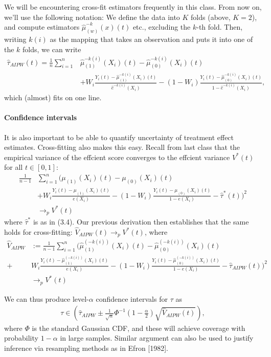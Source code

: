 We will be encountering cross-fit estimators frequently in this class. From now on,
we'll use the following notation: We define the data into $K$ folds (above, $K=2$), and
compute estimators $\hat{\mu}_{(w)}^{-k}(x)(t)$ etc., excluding the $k$-th fold. Then,
writing $k(i)$ as the mapping that takes an observation and puts it into one of the $k$
folds, we can write
\begin{align}
    \hat{\tau}_{AIPW}(t) = \frac{1}{n} \sum_{i=1}^n &\hat{\mu}_{(1)}^{-k(i)}(X_i)(t) -
    \hat{\mu}_{(0)}^{-k(i)}(X_i)(t)\\
    &+ W_i \frac{Y_i(t) - \hat{\mu}_{(1)}^{-k(i)}(X_i)(t)}{\hat{e}^{-k(i)}(X_i)} - (1 -
    W_i) \frac{Y_i(t) - \hat{\mu}_{(0)}^{-k(i)}(X_i)(t)}{1 - \hat{e}^{-k(i)}(X_i)},
\end{align}
which (almost) fits on one line.


\paragraph{Confidence intervals}

It is also important to be able to quantify uncertainty of treatment effect estimates.
Cross-fitting also makes this easy. Recall from last class that the empirical variance
of the effcient score converges to the effcient variance $V^\ast(t)$ for all $t \in [0,
1]$:
\begin{align}
    \frac{1}{n - 1} &\sum_{i = 1}^n (\mu_{(1)}(X_i)(t) - \mu_{(0)}(X_i)(t)\\
    &+ W_i \frac{Y_i(t) - \mu_{(1)}(X_i)(t)}{e(X_i)} - (1 - W_i) \frac{Y_i(t) -
    \mu_{(0)}(X_i)(t)}{1- e(X_i)} - \hat{\tau}^\ast(t))^2\\
    &\to_p V^\ast(t)
\end{align}
where $\hat{\tau}^\ast$ is as in (3.4). Our previous derivation then establishes that
the same holds for cross-fitting: $\hat{V}_{AIPW}(t) \to_p V^\ast(t)$, where
\begin{align}
    \hat{V}_{AIPW} &:= \frac{1}{n - 1} \sum_{i = 1}^n
    (\hat{\mu}_{(1)}^{(-k(i))}(X_i)(t) - \hat{\mu}_{(0)}^{(-k(i))}(X_i)(t)\\
    + &W_i \frac{Y_i(t) - \hat{\mu}_{(1)}^{(-k(i))}(X_i)(t)}{e(X_i)} - (1 - W_i)
    \frac{Y_i(t) - \hat{\mu}_{(0)}^{(-k(i))}(X_i)(t)}{1- e(X_i)} -
    \hat{\tau}_{AIPW}(t))^2\\
    &\to_p V^\ast(t)
\end{align}

We can thus produce level-$\alpha$ confidence intervals for $\tau$ as
\begin{align}
    \tau \in (\hat{\tau}_{AIPW} \pm \frac{1}{\sqrt{n}} \Phi^{-1}(1 -
    \frac{\alpha}{2})\sqrt{\hat{V}_{AIPW}(t)}),
\end{align}
where $\Phi$ is the standard Gaussian CDF, and these will achieve coverage with
probability $1-\alpha$ in large samples. Similar argument can also be used to justify
inference via resampling methods as in Efron [1982].

